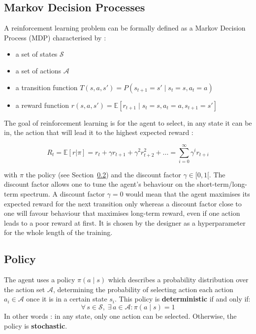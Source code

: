 \subsection{Markov Decision Processes}
A reinforcement learning problem can be formally defined as a Markov 
Decision Process (MDP)  characterised by :
\begin{itemize}
	\item a set of states $\mathcal{S}$
	\item a set of actions $\mathcal{A}$
	\item a transition function 
		$T(s, a, s') = P(s_{t+1} = s' \mid s_t = s, a_t = a)$
	\item a reward function 
		$r(s, a, s') = \mathbb{E}
		 [r_{t+1} \mid s_t = s, a_t = a, s_{t+1} = s']$
\end{itemize}

The goal of reinforcement learning is for the agent to select, in any state it
can be in, the action that will lead it to the highest expected reward :

\begin{equation}
\label{eq:discounted_reward}
R_t = \mathbb{E}[r|\pi] = r_t + \gamma r_{t+1} + \gamma^2 r_{t+2}^2 + ... =
 \sum\limits_{i=0}^\infty \gamma^i r_{t+i}
\end{equation}

\noindent with $\pi$ the policy (see Section~\ref{sec:policy}) and 
the discount factor  $\gamma \in [0, 1[$.
The discount factor allows one to tune the agent's behaviour on the
short-term/long-term spectrum. A discount factor $\gamma=0$ would mean that the
agent maximises its expected reward for the next transition only whereas a
discount factor close to one will favour behaviour that maximises long-term
reward, even if one action leads to a poor reward at first. It is chosen
by the designer as a hyperparameter for the whole length of the training.\\

\subsection{Policy}
\label{sec:policy}
The agent uses a policy $\pi(a \mid s)$ which describes a probability
distribution over the action set $\mathcal{A}$, determining the probability of
selecting action each action $a_i \in \mathcal{A}$ once it is
in a certain state $s_i$. This policy is \textbf{deterministic} if and only if:
\begin{equation}
\forall\, s \in \mathcal{S},\; \exists\, a \in \mathcal{A} : \pi(a \mid s) = 1
\end{equation}
\noindent In other words : in any state, only one action can be selected.
Otherwise, the policy is \textbf{stochastic}.

